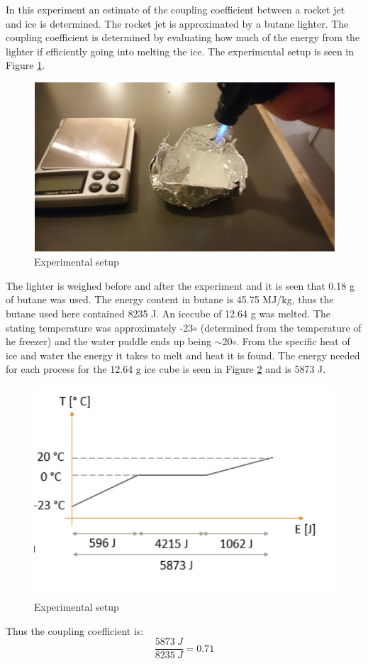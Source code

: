 \label{app:coupling}

In this experiment an estimate of the coupling coefficient between a rocket jet and ice is determined. The rocket jet is approximated by a butane lighter. The coupling coefficient is determined by evaluating how much of the energy from the lighter if efficiently going into melting the ice. The experimental setup is seen in Figure \ref{fig:coupling}.

\begin{figure}[htb]
\begin{center}
\includegraphics[scale=0.8]{figures/navtheory/coupling}
\caption{Experimental setup}
\label{fig:coupling}
\end{center}
\end{figure}

The lighter is weighed before and after the experiment and it is seen that 0.18 g of butane was used. The energy content in butane is 45.75 MJ/kg, thus the butane used here contained 8235 J. An icecube of 12.64 g was melted. The stating temperature was approximately -23$\circ$ (determined from the temperature of he freezer) and the water puddle ends up being $\sim$20$\circ$. From the specific heat of ice and water the energy it takes to melt and heat it is found. The energy needed for each process for the 12.64 g ice cube is seen in Figure \ref{fig:lucascouplinggraf} and is 5873 J.
\begin{figure}[htb]
\begin{center}
\includegraphics[scale=0.8]{figures/navtheory/couplinggraf}
\caption{Experimental setup}
\label{fig:lucascouplinggraf}
\end{center}
\end{figure}

Thus the coupling coefficient is:
\begin{equation}
\dfrac{5873\ J}{8235 \ J}= 0.71
\end{equation}

